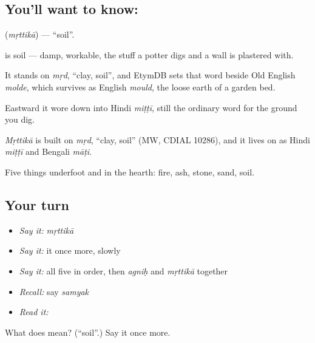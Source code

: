 \subsection*{You'll want to know: }
\textbf{} (\emph{mṛttikā}) — \textquotedblleft{}soil\textquotedblright{}.

\textbf{} is soil — damp, workable, the stuff a potter digs and a wall is plastered with.

It stands on \emph{mṛd}, \textquotedblleft{}clay, soil\textquotedblright{}, and EtymDB sets that word beside Old English \emph{molde}, which survives as English \emph{mould}, the loose earth of a garden bed.

Eastward it wore down into Hindi \emph{miṭṭī}, still the ordinary word for the ground you dig.

\begin{cousinweb}
\emph{Mṛttikā} is built on \emph{mṛd}, \textquotedblleft{}clay, soil\textquotedblright{} (MW, CDIAL 10286), and it lives on as Hindi \emph{miṭṭī} and Bengali \emph{māṭi}.
\end{cousinweb}

\begin{grammarlens}[title={What you've built}]
Five things underfoot and in the hearth: fire, ash, stone, sand, soil.
\end{grammarlens}

\subsection*{Your turn}
\begin{itemize}
\raggedright
  \item \emph{Say it:} \emph{mṛttikā}
  \item \emph{Say it:} it once more, slowly
  \item \emph{Say it:} all five in order, then \emph{agniḥ} and \emph{mṛttikā} together
  \item \emph{Recall:} say \emph{samyak}
  \item \emph{Read it:} \textbf{}
\end{itemize}

\begin{tcolorbox}[breakable,colback=teal!4,colframe=teal!35!black,title={Before you move on}]
What does  mean? (\textquotedblleft{}soil\textquotedblright{}.) Say it once more.
\end{tcolorbox}
